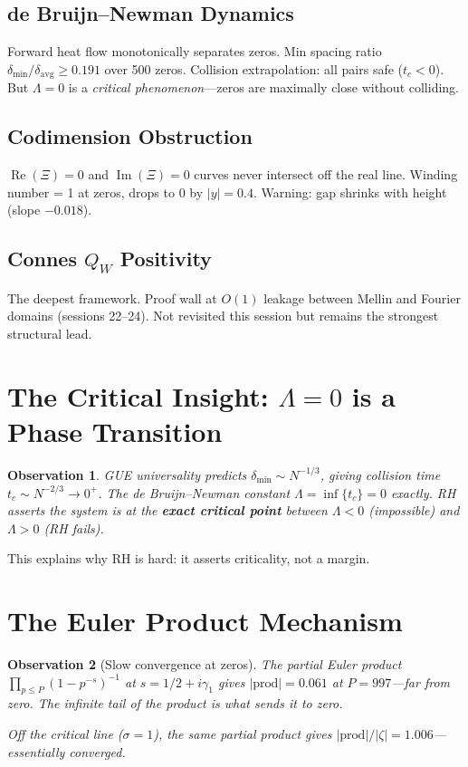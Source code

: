 \documentclass[11pt]{article}
\newtheorem{observation}{Observation}
\begin{document}
\subsection{de Bruijn--Newman Dynamics}
Forward heat flow monotonically separates zeros. Min spacing ratio $\delta_{\min}/\delta_{\mathrm{avg}} \geq 0.191$ over 500 zeros. Collision extrapolation: all pairs safe ($t_c < 0$). But $\Lambda = 0$ is a \emph{critical phenomenon}---zeros are maximally close without colliding.

\subsection{Codimension Obstruction}
$\operatorname{Re}(\Xi) = 0$ and $\operatorname{Im}(\Xi) = 0$ curves never intersect off the real line. Winding number = 1 at zeros, drops to 0 by $|y| = 0.4$. Warning: gap shrinks with height (slope $-0.018$).

\subsection{Connes $Q_W$ Positivity}
The deepest framework. Proof wall at $O(1)$ leakage between Mellin and Fourier domains (sessions 22--24). Not revisited this session but remains the strongest structural lead.

\section{The Critical Insight: $\Lambda = 0$ is a Phase Transition}

\begin{observation}
GUE universality predicts $\delta_{\min} \sim N^{-1/3}$, giving collision time $t_c \sim N^{-2/3} \to 0^+$. The de Bruijn--Newman constant $\Lambda = \inf\{t_c\} = 0$ exactly. RH asserts the system is at the \textbf{exact critical point} between $\Lambda < 0$ (impossible) and $\Lambda > 0$ (RH fails).
\end{observation}

This explains why RH is hard: it asserts criticality, not a margin.

\section{The Euler Product Mechanism}

\begin{observation}[Slow convergence at zeros]
The partial Euler product $\prod_{p \leq P} (1 - p^{-s})^{-1}$ at $s = 1/2 + i\gamma_1$ gives $|\text{prod}| = 0.061$ at $P = 997$---far from zero. The infinite tail of the product is what sends it to zero.

Off the critical line ($\sigma = 1$), the same partial product gives $|\text{prod}|/|\zeta| = 1.006$---essentially converged.
\end{observation}
\end{document}
